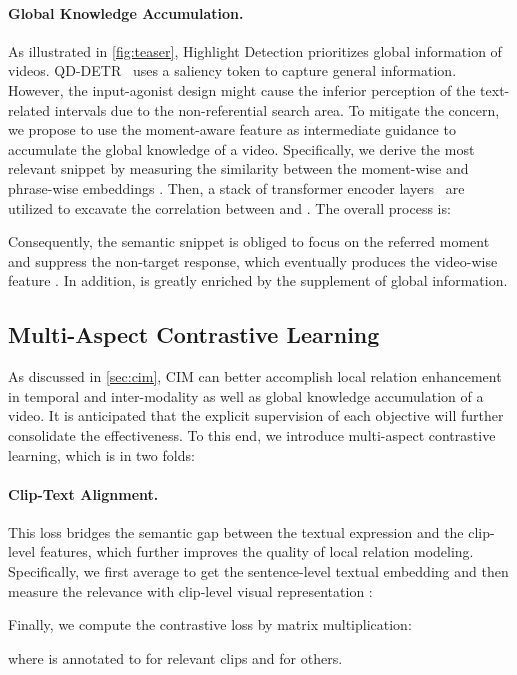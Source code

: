 \documentclass[10pt,twocolumn,letterpaper]{article}
\begin{document}
\vspace{-10pt}
\paragraph{Global Knowledge Accumulation.}
As illustrated in \cref{fig:teaser}, Highlight Detection prioritizes global information of videos.
QD-DETR~\cite{qddetr} uses a saliency token to capture general information. 
However, the input-agonist design might cause the inferior perception of the text-related intervals due to the non-referential search area.
To mitigate the concern, we propose to use the moment-aware feature as intermediate guidance to accumulate the global knowledge of a video.  
Specifically, we derive the most relevant snippet  by measuring the similarity between the moment-wise  and phrase-wise embeddings . Then, a stack of transformer encoder layers~\cite{transformer} are utilized to excavate the correlation between  and . The overall process is:

Consequently, the semantic snippet is obliged to focus on the referred moment and suppress the non-target response, which eventually produces the video-wise feature . In addition,  is greatly enriched by the supplement of global information.  

\subsection{Multi-Aspect Contrastive Learning}
\label{sec:MACL}
As discussed in \cref{sec:cim}, CIM can better accomplish local relation enhancement in temporal and inter-modality as well as global knowledge accumulation of a video. It is anticipated that the explicit supervision of each objective will further consolidate the effectiveness. To this end, we introduce multi-aspect contrastive learning, which is in two folds:  
\paragraph{Clip-Text Alignment.} This loss bridges the semantic gap between the textual expression and the clip-level features, which further improves the quality of local relation modeling. Specifically, we first average  to get the sentence-level textual embedding  and then measure the relevance with clip-level visual representation :

Finally, we compute the contrastive loss by matrix multiplication:

where  is annotated to  for relevant clips and  for others.
\end{document}
